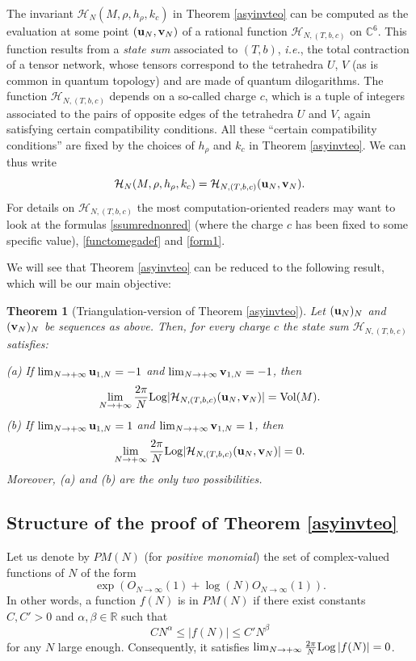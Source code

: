 \documentclass[11pt]{amsart}
\newtheorem{teo}{Theorem}[section]
\newcommand{\mc}{\mathbb{C}}
\newcommand{\R}{\mathbb{R}}
\newcommand{\bu}{{\bf u}}
\newcommand{\bv}{{\bf v}}
\newcommand{\Log}{{\rm Log}}
\newcommand{\Hh}{{\mathcal H}}
\newcommand{\ra}{\rightarrow}
\begin{document}
The invariant $\Hh_{N}(M,\rho,h_\rho,k_c)$ in Theorem \ref{asyinvteo} can be computed as the evaluation at some point $(\bu_N,\bv_N)$ of a rational function $\Hh_{N,(T,b,c)}$ on $\mc^6$. This function results from a {\it state sum} associated to $(T,b)$, {\it i.e.}, the total contraction of a tensor network, whose tensors correspond to the tetrahedra $U$, $V$ (as is common in quantum topology) and are made of quantum dilogarithms. The function $\Hh_{N,(T,b,c)}$ depends on a so-called charge $c$, which is a tuple of integers associated to the pairs of opposite edges of the tetrahedra $U$ and $V$, again satisfying certain compatibility conditions. All these ``certain compatibility conditions'' are fixed by the choices of $h_\rho$ and $k_c$ in Theorem \ref{asyinvteo}. We can thus write 
$$ \Hh_{N}(M,\rho,h_\rho,k_c) = \Hh_{N,(T,b,c)}(\bu_N,\bv_N).$$
For details on $\Hh_{N,(T,b,c)}$ the most computation-oriented readers may want to look at the formulas \eqref{ssumrednonred} (where the charge $c$ has been fixed to some specific value), \eqref{functomegadef} and \eqref{form1}. 
\smallskip

We will see that Theorem \ref{asyinvteo} can be reduced to the following result, which will be our main objective:

\begin{teo}[Triangulation-version of Theorem \ref{asyinvteo}]\label{thm:main_triang}
	Let $(\bu_N)_{N}$ and $(\bv_N)_{N}$ be sequences as above. 	Then, for every charge $c$ the state sum $\Hh_{N,(T,b,c)}$ satisfies:
	\smallskip
	
	\noindent (a) If $\lim_{N\ra +\infty}\bu_{1,N}=-1$ and $\lim_{N\ra +\infty}\bv_{1,N}=-1$, then
	$$\lim_{N\ra +\infty} \frac{2\pi}{N} \Log \vert \Hh_{N,(T,b,c)}(\bu_N,\bv_N)\vert = {\rm Vol}(M).$$ 
	(b)  If $\lim_{N\ra +\infty}\bu_{1,N}=1$ and $\lim_{N\ra +\infty}\bv_{1,N}=1$, then
	$$\lim_{N\ra +\infty} \frac{2\pi}{N} \Log \vert \Hh_{N,(T,b,c)}(\bu_N,\bv_N)\vert = 0.$$
	Moreover, (a) and (b) are the only two possibilities.
\end{teo}

\subsection{Structure of the proof of Theorem \ref{asyinvteo}}\label{sec:sketchproof} Let us denote by $PM(N)$ (for \textit{positive monomial}) the set of complex-valued functions of $N$ of the form $$\exp\left (O_{N\to \infty}(1) + \log(N) O_{N\to \infty}(1)\right ).$$
In other words, a function $f(N)$ is in $PM(N)$ if there exist constants $C, C'>0$ and $\alpha,\beta \in \R$ such that
$$ C N^\alpha \leqslant \vert f(N)\vert \leqslant C' N^\beta$$
for any $N$ large enough. 
Consequently, it satisfies $\lim_{N\ra +\infty} \textstyle \frac{2\pi}{N}\Log \left \vert f(N) \right \vert = 0$.
\end{document}

